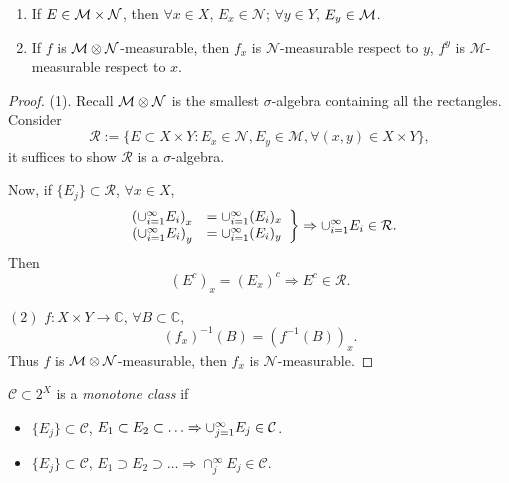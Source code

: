 \begin{prop}
    \label{Prop:SectionMeasurable}
    \begin{enumerate}
        \item If $E\in\mathcal{M}\times\mathcal{N}$, then $\forall x\in X$, 
        $E_{x}\in\mathcal{N}$; $\forall y\in Y$, $E_{y}\in\mathcal{M}$.
        \item If $f$ is $\mathcal{M}\otimes\mathcal{N}$-measurable, 
        then $f_x$ is $\mathcal{N}$-measurable respect to $y$, 
        $f^{y}$ is $\mathcal{M}$-measurable respect to $x$.
    \end{enumerate}
\end{prop}
\begin{proof}
    (1). Recall $\mathcal{M}\otimes\mathcal{N}$ is the smallest 
    $\sigma$-algebra containing all the rectangles. 
    Consider 
    \begin{displaymath}
        \mathcal{R}:=\{E\subset X\times Y: E_{x}\in\mathcal{N},
        E_{y}\in\mathcal{M},\forall(x,y)\in X\times Y\},
    \end{displaymath}
    it suffices to show $\mathcal{R}$ is a $\sigma$-algebra. 

    Now, if $\{E_{j}\}\subset\mathcal{R}$, $\forall x\in X$, 
    \begin{displaymath}
        \left.
        \begin{array}{rl}
        \left(\cup_{i=1}^{\infty}E_{i}\right)_{x}&=\cup_{i=1}^{\infty}(E_i)_{x}\\
        \left(\cup_{i=1}^{\infty}E_{i}\right)_{y}&=\cup_{i=1}^{\infty}(E_i)_{y}\\
        \end{array}
        \right\}\Rightarrow \cup_{i=1}^{\infty}E_{i}\in\mathcal{R}.
    \end{displaymath}
    Then 
    \begin{displaymath}
        (E^{c})_{x}=(E_{x})^{c}\Rightarrow E^{c}\in\mathcal{R}.
    \end{displaymath}

    $(2)$ $f:X\times Y\rightarrow\mathbb{C}$, 
    $\forall B\subset\mathbb{C}$, 
    \begin{displaymath}
        (f_{x})^{-1}(B)=(f^{-1}(B))_{x}.
    \end{displaymath}
    Thus $f$ is $\mathcal{M}\otimes\mathcal{N}$-measurable, 
    then $f_{x}$ is $\mathcal{N}$-measurable.
\end{proof}
\begin{defn}
    $\mathcal{C}\subset 2^{X}$ is a \textit{monotone class }if 
    \begin{itemize}
        \item $\{E_{j}\}\subset\mathcal{C}$, $E_{1}\subset E_{2}\subset
        \ldots\Rightarrow\cup_{j=1}^{\infty}E_{j}\in\mathcal{C}$.
        \item $\{E_{j}\}\subset\mathcal{C}$, $E_{1}\supset E_{2}\supset
        \ldots\Rightarrow\cap_{j}^{\infty}E_{j}\in\mathcal{C}$.
    \end{itemize}
\end{defn}
